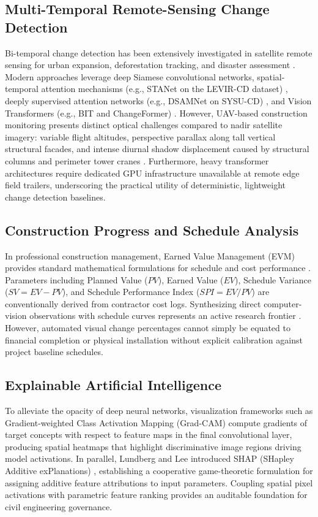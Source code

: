 \documentclass[conference]{IEEEtran}
\begin{document}
\subsection{Multi-Temporal Remote-Sensing Change Detection}
Bi-temporal change detection has been extensively investigated in satellite remote sensing for urban expansion, deforestation tracking, and disaster assessment \cite{radke2005image}. Modern approaches leverage deep Siamese convolutional networks, spatial-temporal attention mechanisms (e.g., STANet on the LEVIR-CD dataset) \cite{chen2020spatial}, deeply supervised attention networks (e.g., DSAMNet on SYSU-CD) \cite{shi2022deeply}, and Vision Transformers (e.g., BIT and ChangeFormer) \cite{chen2022remote, bandara2022transformer}. However, UAV-based construction monitoring presents distinct optical challenges compared to nadir satellite imagery: variable flight altitudes, perspective parallax along tall vertical structural facades, and intense diurnal shadow displacement caused by structural columns and perimeter tower cranes \cite{roberts2019end}. Furthermore, heavy transformer architectures require dedicated GPU infrastructure unavailable at remote edge field trailers, underscoring the practical utility of deterministic, lightweight change detection baselines.

\subsection{Construction Progress and Schedule Analysis}
In professional construction management, Earned Value Management (EVM) provides standard mathematical formulations for schedule and cost performance \cite{fleming2016earned, anbari2003earned}. Parameters including Planned Value ($PV$), Earned Value ($EV$), Schedule Variance ($SV = EV - PV$), and Schedule Performance Index ($SPI = EV / PV$) are conventionally derived from contractor cost logs. Synthesizing direct computer-vision observations with schedule curves represents an active research frontier \cite{reja2022computer, rehman2022automated}. However, automated visual change percentages cannot simply be equated to financial completion or physical installation without explicit calibration against project baseline schedules.

\subsection{Explainable Artificial Intelligence}
To alleviate the opacity of deep neural networks, visualization frameworks such as Gradient-weighted Class Activation Mapping (Grad-CAM) \cite{selvaraju2017grad} compute gradients of target concepts with respect to feature maps in the final convolutional layer, producing spatial heatmaps that highlight discriminative image regions driving model activations. In parallel, Lundberg and Lee introduced SHAP (SHapley Additive exPlanations) \cite{lundberg2017unified}, establishing a cooperative game-theoretic formulation for assigning additive feature attributions to input parameters. Coupling spatial pixel activations with parametric feature ranking provides an auditable foundation for civil engineering governance.
\end{document}
